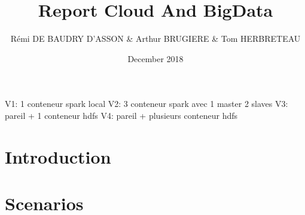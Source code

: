 \documentclass{article}
\title{Report Cloud And BigData}
\author{Rémi DE BAUDRY D'ASSON & Arthur BRUGIERE & Tom HERBRETEAU }
\date{December 2018}
\begin{document}
\maketitle

V1: 1 conteneur spark local
V2: 3 conteneur spark avec 1 master 2 slaves
V3: pareil + 1 conteneur hdfs
V4: pareil + plusieurs conteneur hdfs

\section{Introduction}

\section{Scenarios}
\end{document}
